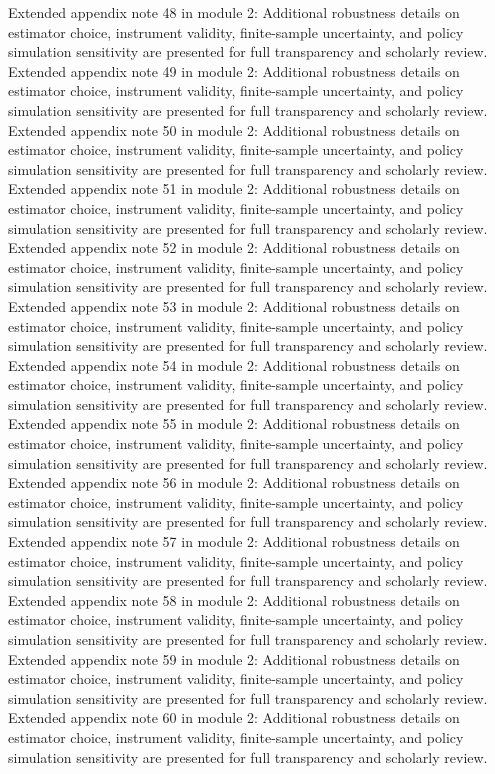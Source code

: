 \documentclass[preprint,12pt]{elsarticle}
\begin{document}
Extended appendix note 48 in module 2: Additional robustness details on estimator choice, instrument validity, finite-sample uncertainty, and policy simulation sensitivity are presented for full transparency and scholarly review.
Extended appendix note 49 in module 2: Additional robustness details on estimator choice, instrument validity, finite-sample uncertainty, and policy simulation sensitivity are presented for full transparency and scholarly review.
Extended appendix note 50 in module 2: Additional robustness details on estimator choice, instrument validity, finite-sample uncertainty, and policy simulation sensitivity are presented for full transparency and scholarly review.
Extended appendix note 51 in module 2: Additional robustness details on estimator choice, instrument validity, finite-sample uncertainty, and policy simulation sensitivity are presented for full transparency and scholarly review.
Extended appendix note 52 in module 2: Additional robustness details on estimator choice, instrument validity, finite-sample uncertainty, and policy simulation sensitivity are presented for full transparency and scholarly review.
Extended appendix note 53 in module 2: Additional robustness details on estimator choice, instrument validity, finite-sample uncertainty, and policy simulation sensitivity are presented for full transparency and scholarly review.
Extended appendix note 54 in module 2: Additional robustness details on estimator choice, instrument validity, finite-sample uncertainty, and policy simulation sensitivity are presented for full transparency and scholarly review.
Extended appendix note 55 in module 2: Additional robustness details on estimator choice, instrument validity, finite-sample uncertainty, and policy simulation sensitivity are presented for full transparency and scholarly review.
Extended appendix note 56 in module 2: Additional robustness details on estimator choice, instrument validity, finite-sample uncertainty, and policy simulation sensitivity are presented for full transparency and scholarly review.
Extended appendix note 57 in module 2: Additional robustness details on estimator choice, instrument validity, finite-sample uncertainty, and policy simulation sensitivity are presented for full transparency and scholarly review.
Extended appendix note 58 in module 2: Additional robustness details on estimator choice, instrument validity, finite-sample uncertainty, and policy simulation sensitivity are presented for full transparency and scholarly review.
Extended appendix note 59 in module 2: Additional robustness details on estimator choice, instrument validity, finite-sample uncertainty, and policy simulation sensitivity are presented for full transparency and scholarly review.
Extended appendix note 60 in module 2: Additional robustness details on estimator choice, instrument validity, finite-sample uncertainty, and policy simulation sensitivity are presented for full transparency and scholarly review.
\end{document}
